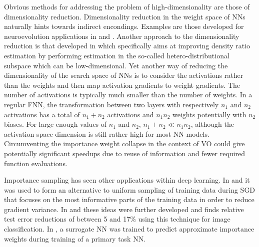 Obvious methods for addressing the problem of high-dimensionality are those of dimensionality reduction. Dimensionality reduction in the weight space of \glspl{NN} naturally hints towards indirect encondings. Examples are those developed for neuroevolution applications in \cite{Stanley2009} and \cite{Koutnik2016}. 
Another approach to the dimensionality reduction is that developed in \cite{Sugiyama2010} which specifically aims at improving density ratio estimation by performing estimation in the so-called hetero-distributional subspace which can be low-dimensional. Yet another way of reducing the dimensionality of the search space of \glspl{NN} is to consider the activations rather than the weights and then map activation gradients to weight gradients. The number of activations is typically much smaller than the number of weights. In a regular \gls{FNN}, the transformation between two layers with respectively $n_1$ and $n_2$ activations has a total of $n_1+n_2$ activations and $n_1n_2$ weights potentially with $n_2$ biases. For large enough values of $n_1$ and $n_2$, $n_1+n_2\ll n_1n_2$, although the activation space dimension is still rather high for most \gls{NN} models.
Circumventing the importance weight collapse in the context of \gls{VO} could give potentially significant speedups due to reuse of information and fewer required function evaluations.

Importance sampling has seen other applications within deep learning. In \cite{Zhao2014} and \cite{Alain2015} it was used to form an alternative to uniform sampling of training data during \gls{SGD} that focuses on the most informative parts of the training data in order to reduce gradient variance. In \cite{Katharopoulos2017} and \cite{Katharopoulos2018} these ideas were further developed and \cite{Katharopoulos2018} finds relative test error reductions of between 5 and 17\% using this technique for image classification. 
In \cite{Katharopoulos2017}, a surrogate \gls{NN} was trained to predict approximate importance weights during training of a primary task \gls{NN}.

